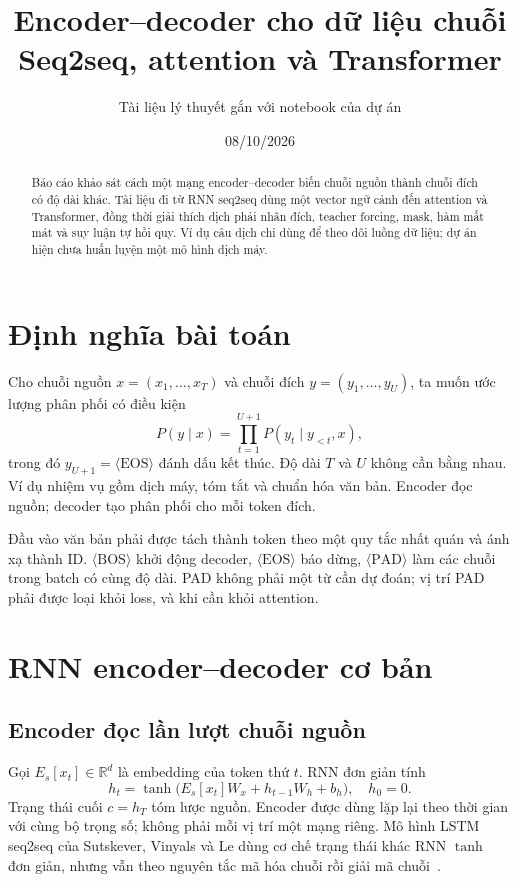 \documentclass[12pt,a4paper]{article}
\title{\textbf{Encoder--decoder cho dữ liệu chuỗi}\\\large Seq2seq, attention và Transformer}
\author{Tài liệu lý thuyết gắn với notebook của dự án}
\date{08/10/2026}
\begin{document}
\maketitle
\begin{abstract}
Báo cáo khảo sát cách một mạng encoder--decoder biến chuỗi nguồn thành chuỗi đích có độ dài khác. Tài liệu đi từ RNN seq2seq dùng một vector ngữ cảnh đến attention và Transformer, đồng thời giải thích dịch phải nhãn đích, teacher forcing, mask, hàm mất mát và suy luận tự hồi quy. Ví dụ câu dịch chỉ dùng để theo dõi luồng dữ liệu; dự án hiện chưa huấn luyện một mô hình dịch máy.
\end{abstract}
\tableofcontents

\section{Định nghĩa bài toán}
Cho chuỗi nguồn $x=(x_1,\ldots,x_T)$ và chuỗi đích $y=(y_1,\ldots,y_U)$, ta muốn ước lượng phân phối có điều kiện
\begin{equation}
P(y\mid x)=\prod_{t=1}^{U+1}P(y_t\mid y_{<t},x),
\end{equation}
trong đó $y_{U+1}=\langle\mathrm{EOS}\rangle$ đánh dấu kết thúc. Độ dài $T$ và $U$ không cần bằng nhau. Ví dụ nhiệm vụ gồm dịch máy, tóm tắt và chuẩn hóa văn bản. Encoder đọc nguồn; decoder tạo phân phối cho mỗi token đích.

Đầu vào văn bản phải được tách thành token theo một quy tắc nhất quán và ánh xạ thành ID. $\langle\mathrm{BOS}\rangle$ khởi động decoder, $\langle\mathrm{EOS}\rangle$ báo dừng, $\langle\mathrm{PAD}\rangle$ làm các chuỗi trong batch có cùng độ dài. PAD không phải một từ cần dự đoán; vị trí PAD phải được loại khỏi loss, và khi cần khỏi attention.

\section{RNN encoder--decoder cơ bản}
\subsection{Encoder đọc lần lượt chuỗi nguồn}
Gọi $E_s[x_t]\in\mathbb R^d$ là embedding của token thứ $t$. RNN đơn giản tính
\begin{equation}
h_t=\tanh\bigl(E_s[x_t]W_x+h_{t-1}W_h+b_h\bigr),\quad h_0=0.
\end{equation}
Trạng thái cuối $c=h_T$ tóm lược nguồn. Encoder được dùng lặp lại theo thời gian với cùng bộ trọng số; không phải mỗi vị trí một mạng riêng. Mô hình LSTM seq2seq của Sutskever, Vinyals và Le dùng cơ chế trạng thái khác RNN $\tanh$ đơn giản, nhưng vẫn theo nguyên tắc mã hóa chuỗi rồi giải mã chuỗi~\cite{sutskever2014}.
\end{document}
